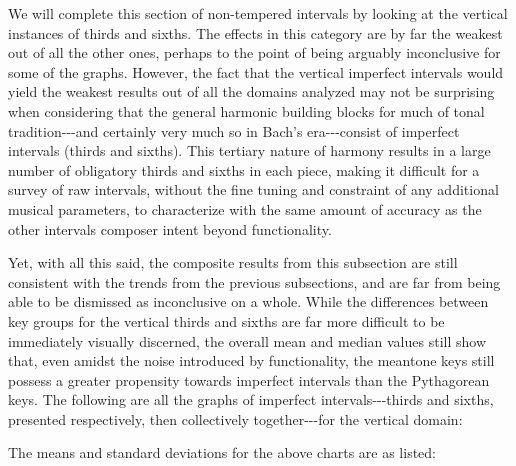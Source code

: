 We will complete this section of non-tempered intervals by looking at
the vertical instances of thirds and sixths. The effects in this
category are by far the weakest out of all the other ones, perhaps to
the point of being arguably inconclusive for some of the graphs.
However, the fact that the vertical imperfect intervals would yield the
weakest results out of all the domains analyzed may not be surprising
when considering that the general harmonic building blocks for much of
tonal tradition-\/-\/-and certainly very much so in Bach's
era-\/-\/-consist of imperfect intervals (thirds and sixths). This
tertiary nature of harmony results in a large number of obligatory
thirds and sixths in each piece, making it difficult for a survey of raw
intervals, without the fine tuning and constraint of any additional
musical parameters, to characterize with the same amount of accuracy as
the other intervals composer intent beyond functionality.

Yet, with all this said, the composite results from this subsection are
still consistent with the trends from the previous subsections, and are
far from being able to be dismissed as inconclusive on a whole. While
the differences between key groups for the vertical thirds and sixths
are far more difficult to be immediately visually discerned, the overall
mean and median values still show that, even amidst the noise introduced
by functionality, the meantone keys still possess a greater propensity
towards imperfect intervals than the Pythagorean keys. The following are
all the graphs of imperfect intervals-\/-\/-thirds and sixths, presented
respectively, then collectively together-\/-\/-for the vertical domain:


    \begin{center}
    \end{center}
    

    \begin{center}
    \end{center}
    


    \begin{center}
    \end{center}
    
    The means and standard deviations for the above charts are as listed:

